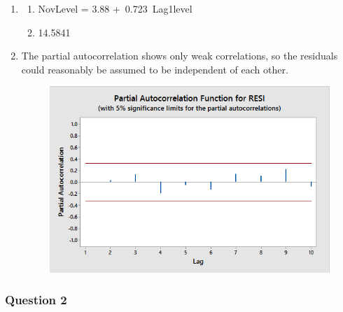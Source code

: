\documentclass{article}
\providecommand{\tightlist}{%
      \setlength{\itemsep}{0pt}\setlength{\parskip}{0pt}}
\begin{document}
\begin{enumerate}
\def\labelenumi{\alph{enumi})}
\setcounter{enumi}{3}
\item
  \begin{enumerate}
  \def\labelenumii{\roman{enumii}.}
  \tightlist
  \item
    NovLevel = 3.88 +~0.723~Lag1level
  \item
    14.5841
  \end{enumerate}
\item
  The partial autocorrelation shows only weak correlations, so the
  residuals could reasonably be assumed to be independent of each other.
  
  \begin{figure}[h!]
 \centering
 \includegraphics[scale=.45]{./images/PACF_residuals.png}
\end{figure}

\end{enumerate}

    \subsubsection{Question 2}\label{question-2}
\end{document}
